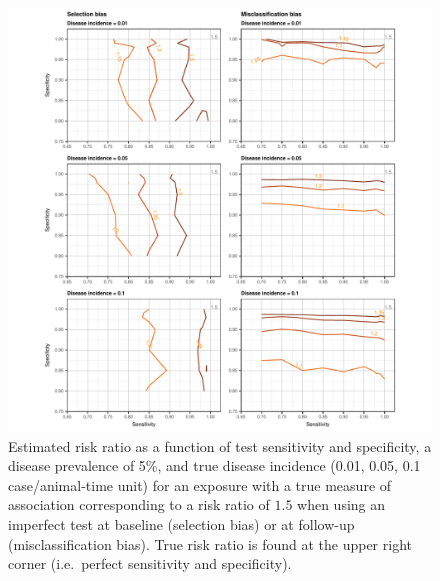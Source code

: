 \documentclass[utf8]{frontiers_suppmat} %
\begin{document}
\begin{figure}[htbp]
  \begin{center}
    \includegraphics[scale=.95]{master-risk15_5_contourX-1}
  \end{center}
  \caption{Estimated risk ratio as a function of test sensitivity and
    specificity, a disease prevalence of 5\%, and true disease incidence (0.01,
    0.05, 0.1 case/animal-time unit) for an exposure with a true measure of
    association corresponding to a risk ratio of \(1.5\) when using an imperfect
    test at baseline (selection bias) or at follow-up (misclassification bias).
    True risk ratio is found at the upper right corner (i.e.\ perfect
    sensitivity and specificity).}
  \label{fig:risk15_contourX5}
\end{figure}
\end{document}
